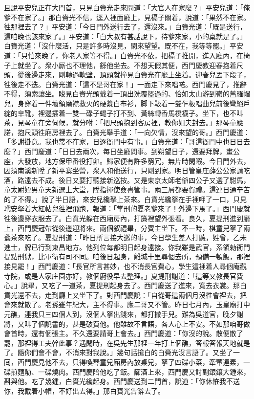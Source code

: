 且說平安兒正在大門首，只見白賚光走來問道：「大官人在家麼？」平安兒道：「俺爹不在家了。」那白賚光不信，逕入裡面廳上，{}見槅子關着，說道：「果然不在家。徃那裡去了？」平安道：「今日門外送行去了，還沒來。」白賚光道：「既是送行，這咱晚也該來家了。」平安道：「白大叔有甚話說下，待爹來家，小的稟就是了。」白賚光道：「沒什麼活，只是許多時沒見，閑來望望。既不在，我等等罷。」{}平安道：「只怕來晚了，你老人家等不得。」白賚光不依，把槅子推開，進入廳內，在椅子上就坐了。衆小厮也不理他，繇他坐去。不想天假其便，西門慶教迎春抱着尺頭，從後邊走來，剛轉過軟壁，頂頭就撞見白賚光在廳上坐着。迎春兒丟下段子，徃後走不迭。白賚光道：「這不是哥在家！」一面走下來唱喏。西門慶見了，推辭不得，須索讓坐。睃見白賚光頭戴着一頂出洗覆盔過的、恰如太山游到嶺的舊羅帽兒，{}身穿着一件壞領磨襟救火的硬漿白布衫，脚下靸着一雙乍板唱曲兒前後彎絕戶綻的皁靴，{}裡邊插着一雙一碌子蠅子打不到、黃絲轉香馬櫈襪子。坐下，也不叫茶，見琴童在旁伺候，就分咐：「把尺頭抱到客房裡，教你姐夫封去。」那琴童應諾，抱尺頭徃廂房裡去了。白賚光舉手道：「一向欠情，沒來望的哥。」西門慶道：「多謝掛意。我也常不在家，日逐衙門中有事。」白賚光道：「哥這衙門中也日日去麼？」西門慶道：「日日去兩次，每日坐廳問事。到朔望日子，還要拜牌，畫公座，大發放，地方保甲番役打卯。歸家便有許多窮冗，無片時閑暇。今日門外去，因須南溪新陞了新平寨坐營，衆人和他送行，只剛到家。明日管皇庄薛公公家請吃酒，路遠去不成。後日又要打聽接新巡按。又是東京太師老爺四公子又選了駙馬，童太尉姪男童天新選上大堂，陞指揮使僉書管事。兩三層都要賀禮。這連日通辛苦的了不得。」說了半日語，來安兒纔拏上茶來。白賁光纔拏在手裡呷了一口，只見玳安拏着大紅帖兒徃裡飛跑，報道：「掌刑的夏老爹來了！外邊下馬了。」西門慶就徃後邊穿衣服去了。白賁光躱在西廂房內，打簾裡望外張看。良久，夏提刑進到廳上，西門慶冠帶從後邊迎將來。兩個叙禮畢，分賓主坐下。不一時，棋童兒拏了兩盞茶來吃了。夏提刑道：「昨日所言接大巡的事，今日學生差人打聽，姓曾，乙未進士，牌已行到東昌地方。他列位每都明日起身遠接。你我雖是武官，系領勑衙門提點刑獄，比軍衛有司不同。咱後日起身，離城十里尋個去所，預備一頓飯，那裡接見罷！」{}西門慶道：「長官所言甚妙，也不消長官費心，學生這裡着人尋個庵觀寺院，或是人家庄園亦好，教個廚役早去整理。」夏提刑謝道：「這等又教長官費心。」說畢，又吃了一道茶，夏提刑起身去了。西門慶送了進來，寬去衣裳。那白賁光還不去，走到廳上又坐下了。對西門慶說：「自從哥這兩個月沒徃會裡去，把會來就散了。老孫雖年紀大，主不得事。應二哥又不管。昨日七月內，玉皇廟打中元醮，連我只三四個人到，沒個人拏出錢來，都打撒手兒。{}難為吳道官，晚夕謝將，又叫了個說書的，甚是破費他。他雖故不言語，各人心上不安。不如那咱哥做會首時，還有個張主。不久還要請哥上會去。」西門慶道：「你沒的說。散便散了罷，那裡得工夫幹此事？遇閑時，在吳先生那裡一年打上個醮，答報答報天地就是了。隨你們會不會，不消來對我說。」幾句話搶白的白賚光沒言語了。又坐了一囘，西門慶見他不去，只得喚琴童兒廂房內放桌兒，拏了四碟小菜，牽葷連素，一碟煎麵觔、一碟燒肉。{}西門慶陪他吃了飯。篩酒上來，西門慶又討副銀鑲大鍾來，斟與他。吃了幾鍾，白賚光纔起身。西門慶送到二門首，說道：「你休恠我不送你，我戴着小帽，不好出去得。」那白賚光告辭去了。

